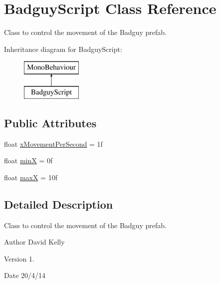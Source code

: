 \hypertarget{class_badguy_script}{\section{Badguy\-Script Class Reference}
\label{class_badguy_script}
}


Class to control the movement of the Badguy prefab.  


Inheritance diagram for Badguy\-Script\-:\begin{figure}[H]
\begin{center}
\leavevmode
\includegraphics[height=2.000000cm]{class_badguy_script}
\end{center}
\end{figure}
\subsection*{Public Attributes}
\begin{DoxyCompactItemize}
\item 
float \hyperlink{class_badguy_script_a54a3b82f3f8a72ac65c2ef9de4d4bb67}{x\-Movement\-Per\-Second} = 1f
\item 
float \hyperlink{class_badguy_script_a4c4bd91ecd881d121488e41bafea8d14}{min\-X} = 0f
\item 
float \hyperlink{class_badguy_script_a25c3c2d6c4f4458d7dceb9eb6e69d7c0}{max\-X} = 10f
\end{DoxyCompactItemize}


\subsection{Detailed Description}
Class to control the movement of the Badguy prefab. 

\begin{DoxyAuthor}{Author}
David Kelly 
\end{DoxyAuthor}
\begin{DoxyVersion}{Version}
1. 
\end{DoxyVersion}
\begin{DoxyDate}{Date}
20/4/14 
\end{DoxyDate}


